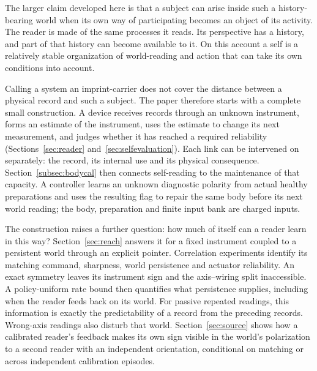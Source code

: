 \documentclass[11pt,a4paper]{article}
\begin{document}
The larger claim developed here is that a subject can arise inside such a history-bearing world when its own way of participating becomes an object of its activity. The reader is made of the same processes it reads. Its perspective has a history, and part of that history can become available to it. On this account a self is a relatively stable organization of world-reading and action that can take its own conditions into account.

Calling a system an imprint-carrier does not cover the distance between a physical record and such a subject. The paper therefore starts with a complete small construction. A device receives records through an unknown instrument, forms an estimate of the instrument, uses the estimate to change its next measurement, and judges whether it has reached a required reliability (Sections~\ref{sec:reader} and~\ref{sec:selfevaluation}). Each link can be intervened on separately: the record, its internal use and its physical consequence. Section~\ref{subsec:bodycal} then connects self-reading to the maintenance of that capacity. A controller learns an unknown diagnostic polarity from actual healthy preparations and uses the resulting flag to repair the same body before its next world reading; the body, preparation and finite input bank are charged inputs.

The construction raises a further question: how much of itself can a reader learn in this way? Section~\ref{sec:reach} answers it for a fixed instrument coupled to a persistent world through an explicit pointer. Correlation experiments identify its matching command, sharpness, world persistence and actuator reliability. An exact symmetry leaves its instrument sign and the axis--wiring split inaccessible. A policy-uniform rate bound then quantifies what persistence supplies, including when the reader feeds back on its world. For passive repeated readings, this information is exactly the predictability of a record from the preceding records. Wrong-axis readings also disturb that world. Section~\ref{sec:source} shows how a calibrated reader's feedback makes its own sign visible in the world's polarization to a second reader with an independent orientation, conditional on matching or across independent calibration episodes.
\end{document}
